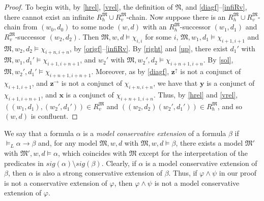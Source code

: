 \documentclass{lmcs} %
\theoremstyle{plain}\newtheorem{satz}[thm]{Satz} %
\newcommand{\sig}{\mathit{sig}}
\newcommand{\bbvarup}{\Zvar^\uparrow}
\newcommand{\bbvarright}{\Zvar^\to}
\newcommand{\fform}[1]{\boldsymbol{#1}}
\newcommand{\xvar}{\fform{x}}
\newcommand{\yvar}{\fform{y}}
\newcommand{\ovar}{\fform{o}}
\newcommand{\Zvar}{\fform{z}}
\begin{document}
\begin{proof}
	To begin with, by \eqref{hrel}, \eqref{vrel}, the definition of $\mathfrak N$, and \eqref{diagf}--\eqref{infiRv},
	there cannot exist an infinite $R_{h}^\mathfrak M\cup R_{v}^\mathfrak M$-chain.
	Now suppose there is an $R_{h}^\mathfrak M\cup R_{v}^\mathfrak M$-chain from $(w_0,d_0)$
	to some node $(w,d)$ with an $R_{h}^\mathfrak M$-successor $(w_{1},d_{1})$ and $R_{v}^\mathfrak M$-successor $(w_{2},d_{2})$. Then $\mathfrak M,w,d\models \chi_{i,i}$ for some $i$, 
	$\mathfrak M,w_{1},d_{1}\models \chi_{i+1,i+1}$ and $\mathfrak M,w_{2},d_{2}\models \chi_{i+n,i+n}$, by \eqref{origf}--\eqref{infiRv}. 
	By \eqref{right} and \eqref{up},
	there exist $d_{1}'$ with $\mathfrak M,w_{1},d_{1}'\models \chi_{i+1,i+n+1}$, and $w_{2}'$ with $\mathfrak M,w_{2}',d_{2}\models \chi_{i+n+1,i+n}$. 
	By \eqref{sol}, $\mathfrak M,w_{2}',d_{1}'\models \chi_{i+n+1,i+n+1}$.	
	Moreover, as by \eqref{diagf}, $\bbvarup$ is not a conjunct of $\chi_{i+1,i+1}$, and $\bbvarright$  is not a conjunct of $\chi_{i+n,i+n}$, we have that $\yvar$ is a conjunct of $\chi_{i+1,i+n+1}$, and 
	$\xvar$ is a conjunct of $\chi_{i+n+1,i+n}$. Thus, by \eqref{hrel} and \eqref{vrel},
	$((w_{1},d_{1}),(w_{2}',d_{1}'))\in R_{v}^\mathfrak M$ and $((w_{2},d_{2})(w_{2}',d_{1}'))\in R_{h}^\mathfrak M$,
	and so $(w,d)$ is confluent.
\end{proof}

We say that a formula $\alpha$ is a \emph{model conservative extension} of a formula $\beta$
if $\models_{L} \alpha \rightarrow \beta$ and, for any model $\mathfrak{M},w,d$
with $\mathfrak{M},w,d\models \beta$, there exists a model $\mathfrak{M}'$
with $\mathfrak{M}',w,d\models \alpha$, which coincides with $\mathfrak{M}$ except for the interpretation of the predicates in $\sig(\alpha)\setminus\sig(\beta)$.
Clearly, if  $\alpha$ is a model conservative extension of $\beta$, then $\alpha$ is also a 
strong conservative extension of $\beta$.  Thus, if $\varphi \wedge \psi$ in our proof is not a conservative extension of $\varphi$, then $\varphi \wedge \psi$ is not a model conservative extension of $\varphi$. 
\end{document}
